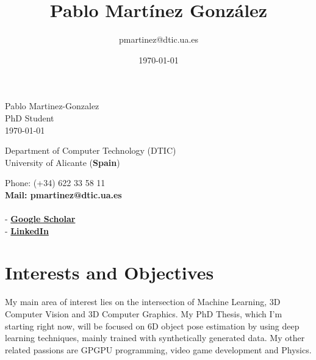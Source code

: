 \documentclass[8pt]{article}
\title{\bfseries\Huge Pablo Martínez González}
\author{pmartinez@dtic.ua.es}
\date{\today}
\begin{document}
\begin{center}
	\Huge Pablo Martinez-Gonzalez\\
	\Large PhD Student\\
	\today
\end{center}
\bigskip
\begin{minipage}[ht]{0.65\textwidth}
Department of Computer Technology (DTIC)\\
University of Alicante (\textbf{Spain})\\
\end{minipage}
\hfill
\begin{minipage}[ht]{0.3\textwidth}
Phone: (+34) 622 33 58 11\\
\textbf{Mail: pmartinez@dtic.ua.es}\\
\\
- \href{https://scholar.google.com/citations?user=d7F3nPUAAAAJ}{\textbf{Google Scholar}}\\
- \href{https://www.linkedin.com/in/pablo-martinez-gonzalez/}{\textbf{LinkedIn}}
\end{minipage}
 
\section*{Interests and Objectives}

My main area of interest lies on the intersection of Machine Learning, 3D Computer Vision and 3D Computer Graphics. My PhD Thesis, which I'm starting right now, will be focused on 6D object pose estimation by using deep learning techniques, mainly trained with synthetically generated data. My other related passions are GPGPU programming, video game development and Physics.
 
\end{document}
